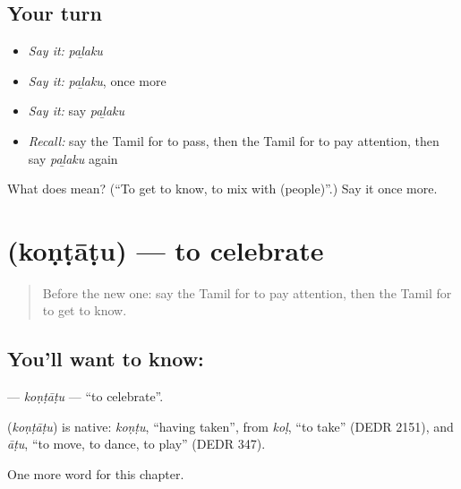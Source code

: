 \subsection*{Your turn}
\begin{itemize}
\raggedright
  \item \emph{Say it:} \emph{paḻaku}
  \item \emph{Say it:} \emph{paḻaku}, once more
  \item \emph{Say it:} say \emph{paḻaku}
  \item \emph{Recall:} say the Tamil for to pass, then the Tamil for to pay attention, then say \emph{paḻaku} again
\end{itemize}

\begin{tcolorbox}[breakable,colback=teal!4,colframe=teal!35!black,title={Before you move on}]
What does  mean? (\textquotedblleft{}To get to know, to mix with (people)\textquotedblright{}.) Say it once more.
\end{tcolorbox}
\section[\texorpdfstring{\ta{கொண்டாடு} (koṇṭāṭu)}{கொண்டாடு (koṇṭāṭu)}]{ (koṇṭāṭu) — to celebrate}

\label{lesson:TA-C165-kontatu}



\begin{quote}
Before the new one: say the Tamil for to pay attention, then the Tamil for to get to know.
\end{quote}

\subsection*{You'll want to know: }
\textbf{} — \emph{koṇṭāṭu} — \textquotedblleft{}to celebrate\textquotedblright{}.

\begin{cousinweb}
\textbf{} (\emph{koṇṭāṭu}) is native: \emph{koṇṭu}, \textquotedblleft{}having taken\textquotedblright{}, from \emph{koḷ}, \textquotedblleft{}to take\textquotedblright{} (DEDR 2151), and \emph{āṭu}, \textquotedblleft{}to move, to dance, to play\textquotedblright{} (DEDR 347).
\end{cousinweb}

\begin{grammarlens}[title={What you've built}]
One more word for this chapter.
\end{grammarlens}

